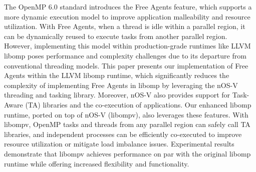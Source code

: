 The OpenMP 6.0 standard introduces the Free Agents feature, which supports a more dynamic execution model to improve application malleability and resource utilization. With Free Agents, when a thread is idle within a parallel region, it can be dynamically reused to execute tasks from another parallel region. However, implementing this model within production-grade runtimes like LLVM libomp poses performance and complexity challenges due to its departure from conventional threading models. This paper presents our implementation of Free Agents within the LLVM libomp runtime, which significantly reduces the complexity of implementing Free Agents in libomp by leveraging the nOS-V threading and tasking library. Moreover, nOS-V also provides support for Task-Aware (TA) libraries and the co-execution of applications. Our enhanced libomp runtime, ported on top of nOS-V (libompv), also leverages these features. With libompv, OpenMP tasks and threads from any parallel region can safely call TA libraries, and independent processes can be efficiently co-executed to improve resource utilization or mitigate load imbalance issues. Experimental results demonstrate that libompv achieves performance on par with the original libomp runtime while offering increased flexibility and functionality.
